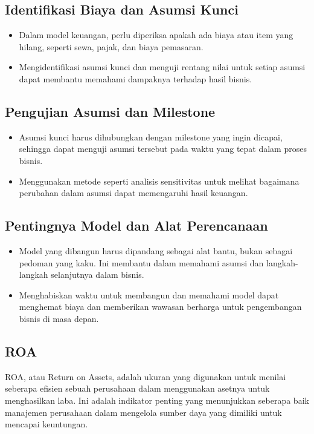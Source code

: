 \documentclass{article}
\begin{document}
\subsection{Identifikasi Biaya dan Asumsi Kunci}
\begin{itemize}
    \item Dalam model keuangan, perlu diperiksa apakah ada biaya atau item yang hilang, seperti sewa, pajak, dan biaya pemasaran.
    \item Mengidentifikasi asumsi kunci dan menguji rentang nilai untuk setiap asumsi dapat membantu memahami dampaknya terhadap hasil bisnis.
\end{itemize}

\subsection{Pengujian Asumsi dan Milestone}
\begin{itemize}
    \item Asumsi kunci harus dihubungkan dengan milestone yang ingin dicapai, sehingga dapat menguji asumsi tersebut pada waktu yang tepat dalam proses bisnis.
    \item Menggunakan metode seperti analisis sensitivitas untuk melihat bagaimana perubahan dalam asumsi dapat memengaruhi hasil keuangan.
\end{itemize}

\subsection{Pentingnya Model dan Alat Perencanaan}
\begin{itemize}
    \item Model yang dibangun harus dipandang sebagai alat bantu, bukan sebagai pedoman yang kaku. Ini membantu dalam memahami asumsi dan langkah-langkah selanjutnya dalam bisnis.
    \item Menghabiskan waktu untuk membangun dan memahami model dapat menghemat biaya dan memberikan wawasan berharga untuk pengembangan bisnis di masa depan.
\end{itemize}

\subsection{ROA}
ROA, atau Return on Assets, adalah ukuran yang digunakan untuk menilai seberapa efisien sebuah perusahaan dalam menggunakan asetnya untuk menghasilkan laba. Ini adalah indikator penting yang menunjukkan seberapa baik manajemen perusahaan dalam mengelola sumber daya yang dimiliki untuk mencapai keuntungan.
\end{document}
